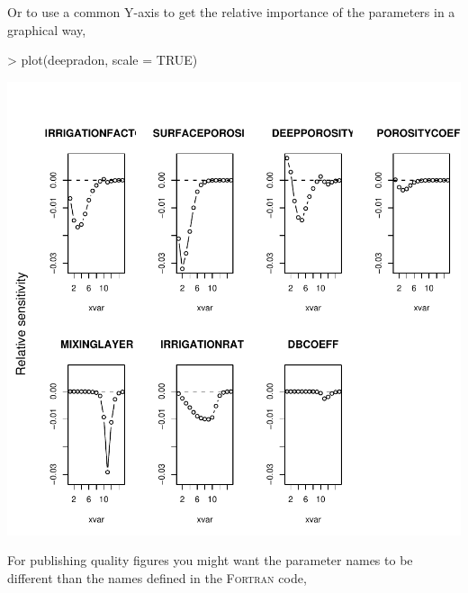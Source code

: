 \documentclass{scrartcl}
\newcommand{\Fortran}{\textsc{Fortran}}
\begin{document}
Or to use a common Y-axis to get the relative importance of the
parameters in a graphical way,

\begin{Schunk}
\begin{Sinput}
> plot(deepradon, scale = TRUE)
\end{Sinput}
\end{Schunk}
\includegraphics{figures/f-024}

For publishing quality figures you might want the parameter names to
be different than the names defined in the \Fortran{} code,
\end{document}
